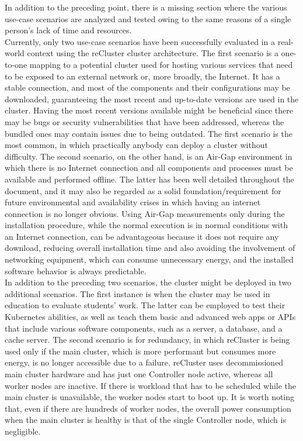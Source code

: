 In addition to the preceding point, there is a missing section where the various
use-case scenarios are analyzed and tested owing to the same reasons of a single
person's lack of time and resources. \\ %
Currently, only two use-case scenarios have been successfully evaluated in a
real-world context using the reCluster cluster architecture. The first scenario is
a one-to-one mapping to a potential cluster used for hosting various services that
need to be exposed to an external network or, more broadly, the Internet. It has
a stable connection, and most of the components and their configurations may be downloaded,
guaranteeing the most recent and up-to-date versions are used in the cluster. Having
the most recent versions available might be beneficial since there may be bugs or
security vulnerabilities that have been addressed, whereas the bundled ones may
contain issues due to being outdated. The first scenario is the most common, in
which practically anybody can deploy a cluster without difficulty. The second scenario,
on the other hand, is an Air-Gap environment in which there is no Internet connection
and all components and processes must be available and performed offline. The
latter has been well detailed throughout the document, and it may also be regarded
as a solid foundation/requirement for future environmental and availability crises
in which having an internet connection is no longer obvious. Using Air-Gap
measurements only during the installation procedure, while the normal execution is
in normal conditions with an Internet connection, can be advantageous because it
does not require any download, reducing overall installation time and also avoiding
the involvement of networking equipment, which can consume unnecessary energy, and
the installed software behavior is always predictable. \\ %
In addition to the preceding two scenarios, the cluster might be deployed in two
additional scenarios. The first instance is when the cluster may be used in education
to evaluate students' work. The latter can be employed to test their Kubernetes abilities,
as well as teach them basic and advanced web apps or APIs that include various
software components, such as a server, a database, and a cache server. The
second scenario is for redundancy, in which reCluster is being used only if the main
cluster, which is more performant but consumes more energy, is no longer accessible
due to a failure. reCluster uses decommissioned main cluster hardware and has
just one Controller node active, whereas all worker nodes are inactive. If there
is workload that has to be scheduled while the main cluster is unavailable, the worker
nodes start to boot up. It is worth noting that, even if there are hundreds of worker
nodes, the overall power consumption when the main cluster is healthy is that of
the single Controller node, which is negligible. \\ %


